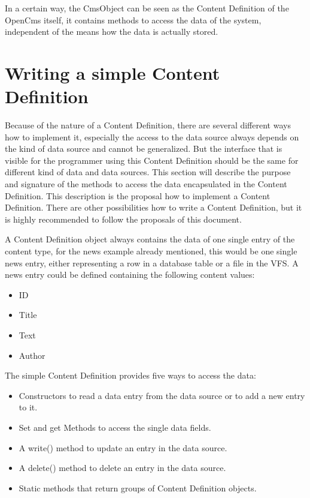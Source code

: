 In a certain way, the CmsObject can be seen as the Content Definition of
the OpenCms itself, it contains methods to access the data of the
system, independent of the means how the data is actually stored.

\section{Writing a simple Content Definition}
Because of the nature of a Content Definition, there are several
different ways how to implement it, especially the access to the data
source always depends on the kind of data source and cannot be
generalized. But the interface that is visible for the programmer using
this Content Definition should be the same for different kind of data and
data sources. This section will describe the purpose and signature 
of the methods to access the data encapsulated in the Content Definition.
This description is the proposal how to implement a Content Definition.
There are other possibilities how to write a Content Definition, but
it is highly recommended to follow the proposals of this document.

A Content Definition object always contains the data of one single entry
of the content type, for the news example already mentioned, this would
be one single news entry, either representing a row in a database table
or a file in the VFS. A news entry could be defined containing the
following content values:

\begin{itemize}
\item ID
\item Title
\item Text
\item Author
\end{itemize}

The simple Content Definition provides five ways to access the
data:
\begin{itemize}
\item Constructors to read a data entry from the data source or to add
a new entry to it.
\item Set and get Methods to access the single data fields.
\item A {\meth write()} method to update an entry in the data source.
\item A {\meth delete()} method to delete an entry in the data source.
\item Static methods that return groups of Content Definition objects.
\end{itemize}

